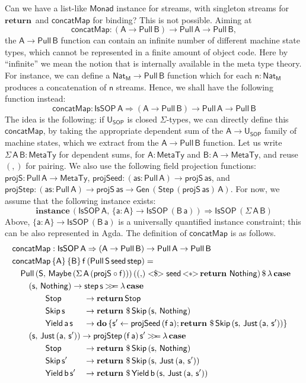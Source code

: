 \documentclass[acmsmall,screen,review,anonymous]{acmart}
\newcommand{\mit}[1]{{\mathsf{#1}}}
\newcommand{\msf}[1]{{\mathsf{#1}}}
\newcommand{\mbf}[1]{{\mathbf{#1}}}
\newcommand{\mdo}{\mbf{do}\,}
\newcommand{\ind}{\hspace{1em}}
\newcommand{\return}{\mbf{return}\,}
\newcommand{\lam}{\lambda\,}
\newcommand{\M}{\msf{M}}
\newcommand{\vas}{\mathsf{as}}
\newcommand{\vn}{\mathsf{n}}
\newcommand{\vA}{\mathsf{A}}
\newcommand{\vB}{\mathsf{B}}
\newcommand{\vS}{\mathsf{S}}
\newcommand{\va}{\mathsf{a}}
\newcommand{\vb}{\mathsf{b}}
\newcommand{\vf}{\mathsf{f}}
\newcommand{\vs}{\mathsf{s}}
\newcommand{\USOP}{\msf{U}_{\msf{SOP}}}
\newcommand{\IsSOP}{\msf{IsSOP}}
\newcommand{\Monad}{\msf{Monad}}
\newcommand{\fro}{\leftarrow}
\newcommand{\case}{\mbf{case\,}}
\newcommand{\concatMap}{\msf{concatMap}}
\newcommand{\bind}{\mathbin{>\!\!>\mkern-6.7mu=}}
\newcommand{\MTy}{\msf{MetaTy}}
\newcommand{\Nat}{\msf{Nat}}
\newcommand{\Maybe}{\msf{Maybe}}
\newcommand{\Nothing}{\msf{Nothing}}
\newcommand{\Just}{\msf{Just}}
\theoremstyle{remark}
\newcommand{\instance}{\mbf{instance}\,}
\newcommand{\Gen}{\msf{Gen}}
\newcommand{\fmap}{<\!\!\$\!\!>}
\newcommand{\ap}{{<\!\!*\!\!>}}
\newcommand{\RA}{\Rightarrow}
\newcommand{\Stop}{\msf{Stop}}
\newcommand{\Skip}{\msf{Skip}}
\newcommand{\Yield}{\msf{Yield}}
\newcommand{\dlr}{\,\$\,}
\newcommand{\seed}{\mit{seed}}
\newcommand{\step}{\mit{step}}
\newcommand{\Step}{\msf{Step}}
\newcommand{\Pull}{\msf{Pull}}
\begin{document}
Can we have a list-like $\Monad$ instance for streams, with singleton streams
for $\return$ and $\concatMap$ for binding? This is not possible. Aiming at
\[ \concatMap : (\vA \to \Pull\,\vB) \to \Pull\,\vA \to \Pull\,\vB, \]
the $\vA \to \Pull\,\vB$ function can contain an infinite number of different
machine state types, which cannot be represented in a finite amount of object
code. Here by ``infinite'' we mean the notion that is internally available in
the meta type theory. For instance, we can define a $\Nat_\M \to \Pull\,\vB$
function which for each $\vn : \Nat_\M$ produces a concatenation of $\vn$
streams. Hence, we shall have the following function instead:
\[ \concatMap : \IsSOP\,\vA \RA (\vA \to \Pull\,\vB) \to \Pull\,\vA \to \Pull\,\vB \]
The idea is the following: if $\USOP$ is closed $\Sigma$-types, we can directly
define this $\concatMap$, by taking the appropriate dependent sum of the $\vA
\to \USOP$ family of machine states, which we extract from the $\vA \to
\Pull\,\vB$ function. Let us write $\Sigma\,\vA\,\vB : \MTy$ for dependent sums,
for $\vA : \MTy$ and $\vB : \vA \to \MTy$, and reuse $({,})$ for pairing.  We
also use the following field projection functions: $\mit{projS} : \Pull\,\vA \to
\MTy$, $\mit{projSeed} : (\vas : \Pull\,\vA) \to \mit{projS}\,\vas$, and
$\mit{projStep} : (\vas : \Pull\,\vA) \to \mit{projS}\,\vas \to
\Gen\,(\Step\,(\mit{projS}\,\vas)\,\vA)$.  For now, we assume that the following
instance exists:
\[ \instance (\IsSOP\,\vA,\,\{\va : \vA\} \to \IsSOP\,(\vB\,\va)) \RA \IsSOP\,(\Sigma\,\vA\,\vB) \]
Above, $\{\va : \vA\} \to \IsSOP\,(\vB\,\va)$ is a universally quantified
instance constraint; this can be also represented in Agda. The definition of
$\concatMap$ is as follows.
\begin{alignat*}{3}
  & \mathrlap{\concatMap : \IsSOP\,\vA \RA (\vA \to \Pull\,\vB) \to \Pull\,\vA \to \Pull\,\vB }\\
  & \mathrlap{\concatMap\,\{\vA\}\,\{\vB\}\,\vf\,(\Pull\,\vS\,\seed\,\step) = }\\
  & \mathrlap{\ind \Pull\,(\vS,\,\Maybe\,(\Sigma\,\vA\,(\mit{projS} \circ \vf)))\,(({,}) \fmap \seed\,\ap\,\return\,\Nothing) \dlr \lam \case }\\
  & \mathrlap{\ind \ind (\vs,\,\Nothing) \to \step\,\vs \bind \lam \case }\\
  & \ind \ind \ind \ind \Stop                 &&\to \return \Stop\\
  & \ind \ind \ind \ind \Skip\,\vs            &&\to \return \dlr \Skip\,(\vs,\, \Nothing)\\
  & \ind \ind \ind \ind \Yield\,\va\,\vs      &&\to \mdo \{\vs' \fro \mit{projSeed}\,(\vf\,\va); \return \dlr \Skip\,(\vs,\,\Just\,(\va,\,\vs'))\}\\
  & \mathrlap{\ind \ind (\vs,\,\Just\,(\va,\,\vs')) \to \mit{projStep}\,(\vf\,\va)\,\vs' \bind \lam \case }\\
  & \ind \ind \ind \ind \Stop                &&\to \return \dlr \Skip\,(\vs,\,\Nothing) \\
  & \ind \ind \ind \ind \Skip\,\vs'          &&\to \return \dlr \Skip\,(\vs,\,\Just\,(\va,\,\vs'))\\
  & \ind \ind \ind \ind \Yield\,\vb\,\vs'    &&\to \return \dlr \Yield\,\vb\,(\vs,\, \Just\,(\va,\,\vs'))
\end{alignat*}
\end{document}
